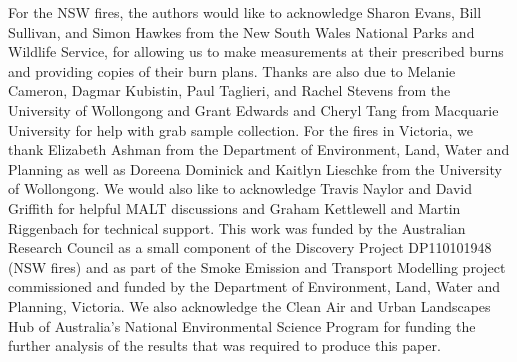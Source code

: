 \documentclass[acp, manuscript]{copernicus}
\begin{document}


\begin{acknowledgements}
For the NSW fires, the authors would like to acknowledge Sharon Evans, Bill Sullivan, and Simon Hawkes from the New South Wales National Parks and Wildlife Service, for allowing us to make measurements at their prescribed burns and providing copies of their burn plans. Thanks are also due to Melanie Cameron, Dagmar Kubistin, Paul Taglieri, and Rachel Stevens from the University of Wollongong and Grant Edwards and Cheryl Tang from Macquarie University for help with grab sample collection. For the fires in Victoria, we thank Elizabeth Ashman from the Department of Environment, Land, Water and Planning as well as Doreena Dominick and Kaitlyn Lieschke from the University of Wollongong. We would also like to acknowledge Travis Naylor and David Griffith for helpful MALT discussions and Graham Kettlewell and Martin Riggenbach for technical support. This work was funded by the Australian Research Council as a small component of the Discovery Project DP110101948 (NSW fires) and as part of the Smoke Emission and Transport Modelling project commissioned and funded by the Department of Environment, Land, Water and Planning, Victoria. We also acknowledge the Clean Air and Urban Landscapes Hub of Australia's National Environmental Science
Program for funding the further analysis of the results that was
required to produce this paper.
\end{acknowledgements}










 
 
\end{document}
